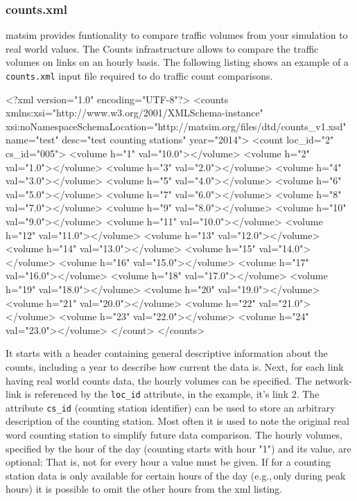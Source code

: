 \subsubsection{counts.xml}
\gls{matsim} provides funtionality to compare traffic volumes from your simulation to real world values. The Counts infrastructure allows to compare the traffic volumes on links on an hourly basis. The following listing shows an example of a \lstinline|counts.xml| input file required to do traffic count comparisons. 

\begin{xml}
<?xml version="1.0" encoding="UTF-8"?> 
<counts xmlns:xsi="http://www.w3.org/2001/XMLSchema-instance" 
        xsi:noNamespaceSchemaLocation="http://matsim.org/files/dtd/counts_v1.xsd" 
        name="test" desc="test counting stations" year="2014"> 
   <count loc_id="2" cs_id="005"> 
      <volume h="1" val="10.0"></volume> 
      <volume h="2" val="1.0"></volume> 
      <volume h="3" val="2.0"></volume> 
      <volume h="4" val="3.0"></volume> 
      <volume h="5" val="4.0"></volume> 
      <volume h="6" val="5.0"></volume> 
      <volume h="7" val="6.0"></volume> 
      <volume h="8" val="7.0"></volume> 
      <volume h="9" val="8.0"></volume> 
      <volume h="10" val="9.0"></volume> 
      <volume h="11" val="10.0"></volume> 
      <volume h="12" val="11.0"></volume> 
      <volume h="13" val="12.0"></volume> 
      <volume h="14" val="13.0"></volume> 
      <volume h="15" val="14.0"></volume> 
      <volume h="16" val="15.0"></volume> 
      <volume h="17" val="16.0"></volume> 
      <volume h="18" val="17.0"></volume> 
      <volume h="19" val="18.0"></volume> 
      <volume h="20" val="19.0"></volume> 
      <volume h="21" val="20.0"></volume> 
      <volume h="22" val="21.0"></volume> 
      <volume h="23" val="22.0"></volume> 
      <volume h="24" val="23.0"></volume> 
   </count> 
</counts>
\end{xml}

It starts with a header containing general descriptive information about the counts, including a year to describe how current the data is. Next, for each link having real world counts data, the hourly volumes can be specified. The network-link is referenced by the \lstinline|loc_id| attribute, in the example, it's link 2. The attribute \lstinline|cs_id| (counting station identifier) can be used to store an arbitrary description of the counting station. Most often it is used to note the original real word counting station to simplify future data comparison. The hourly volumes, specified by the hour of the day (counting starts with hour "1") and its value, are optional: That is, not for every hour a value must be given. If for a counting station data is only available for certain hours of the day (e.g.,\,only during peak hours) it is possible to omit the other hours from the \gls{xml} listing. 

